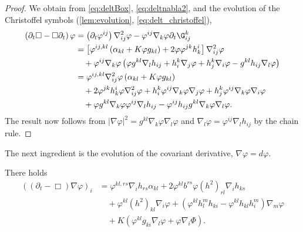 \documentclass[12pt]{amsart}
\begin{document}
\begin{proof}
We obtain from \cref{eq:deltBox}, \cref{eq:deltnabla2}, and the evolution of the Christoffel symbols (\cref{lem:evolution}, \cref{eq:delt_christoffel}),
\[
\begin{split}
\left(\partial_{t}\Box - \Box\partial_{t}\right) \varphi &= \left(\partial_{t}\varphi^{ij}\right) \nabla^2_{ij} \varphi - \varphi^{ij}\nabla_k \varphi\partial_t \G^{k}_{ij} \\
&= \left[\varphi^{ij,kl} \left(\alpha_{kl} + K \varphi g_{kl}\right) + 2\varphi\varphi^{jk}h^{i}_{k}\right] \nabla^2_{ij} \varphi \\
&\quad + \varphi^{ij} \nabla_k \varphi \left(\varphi g^{kl} \nabla_l h_{ij} + h^k_i \nabla_j \varphi + h^k_j \nabla_i \varphi - g^{kl} h_{ij} \nabla_l \varphi\right) \\
&= \varphi^{ij,kl} \nabla^2_{ij} \varphi \left(\alpha_{kl} + K \varphi g_{kl}\right) \\
&\quad + 2\varphi^{jk}h^{i}_{k}\varphi \nabla^2_{ij} \varphi + h^k_i \varphi^{ij} \nabla_k \varphi \nabla_j \varphi + h^k_j \varphi^{ij} \nabla_k \varphi \nabla_i \varphi \\
&\quad + \varphi g^{kl}\nabla_k \varphi \varphi^{ij} \nabla_l h_{ij} - \varphi^{ij} h_{ij} g^{kl}\nabla_k \varphi \nabla_l \varphi.
\end{split}
\]
The result now follows from \(|\nabla \varphi|^2 = g^{kl}\nabla_k \varphi \nabla_l \varphi\) and \(\nabla_l \varphi = \varphi^{ij} \nabla_l h_{ij}\) by the chain rule.
\end{proof}

The next ingredient is the evolution of the covariant derivative, \(\nabla \varphi = d\varphi\).

\begin{lemma}
\label{lem:Evgradphi}
There holds
\[
\begin{split}
\left((\partial_{t}-\Box)\nabla\varphi\right)_{i} &= \varphi^{kl,rs}\nabla_i h_{rs} \alpha_{kl} + 2 \varphi^{kl} b^{rs} \varphi(h^2)_{rl} \nabla_i h_{ks} \\
&\quad + \varphi^{kl}(h^2)_{kl}\nabla_i \varphi + \left(\varphi^{kl}h^{m}_{l}h_{ki} - \varphi^{kl}h_{kl}h^{m}_{i}\right) \nabla_m \varphi\\
&\quad + K\left(\varphi^{kl}g_{ki} \nabla_l \varphi + \varphi \nabla_i \Phi\right).
\end{split}
\]
\end{lemma}
\end{document}
